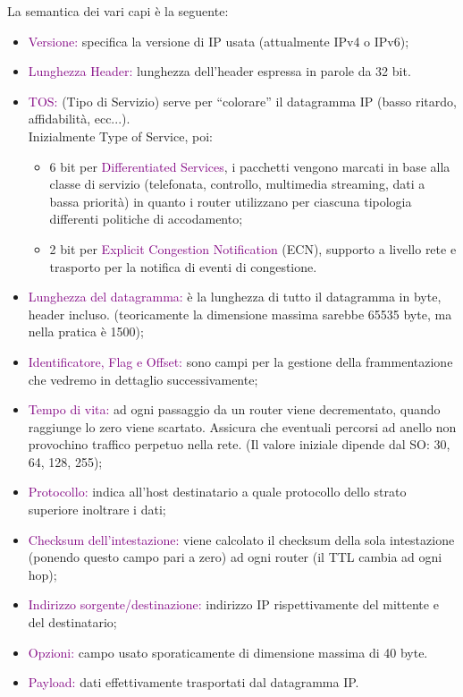 La semantica dei vari capi è la seguente:
\begin{itemize}
    \item \textcolor{purple}{Versione:} specifica la versione di IP usata (attualmente IPv4 o IPv6); 
    \item \textcolor{purple}{Lunghezza Header:} lunghezza dell'header espressa in parole da 32 bit.
    \item \textcolor{purple}{TOS:} (Tipo di Servizio) serve per “colorare” il datagramma IP (basso ritardo, affidabilità, ecc...). 
    \\Inizialmente Type of Service, poi:
        \begin{itemize}
            \item 6 bit per \textcolor{purple}{Differentiated Services}, i pacchetti vengono marcati in base alla classe di servizio (telefonata, controllo, multimedia streaming, dati a bassa priorità) in quanto i router utilizzano per ciascuna tipologia differenti politiche di accodamento;
            \item 2 bit per \textcolor{purple}{Explicit Congestion Notification} (ECN), supporto a livello rete e trasporto per la notifica di eventi di congestione.
        \end{itemize}
    \item \textcolor{purple}{Lunghezza del datagramma:} è la lunghezza di tutto il datagramma in byte, header incluso. (teoricamente la dimensione massima sarebbe 65535 byte, ma nella pratica è 1500);
    \item \textcolor{purple}{Identificatore, Flag e Offset:} sono campi per la gestione della frammentazione che vedremo in dettaglio successivamente;
    \item \textcolor{purple}{Tempo di vita:} ad ogni passaggio da un router viene decrementato, quando raggiunge lo zero viene scartato. Assicura che eventuali percorsi ad anello non provochino traffico perpetuo nella rete. (Il valore iniziale dipende dal SO: 30, 64, 128, 255);
    \item \textcolor{purple}{Protocollo:} indica all’host destinatario a quale protocollo dello strato superiore inoltrare i dati;
    \item \textcolor{purple}{Checksum dell'intestazione:} viene calcolato il checksum della sola intestazione (ponendo questo campo pari a zero) ad ogni router (il TTL cambia ad ogni hop);
    \item \textcolor{purple}{Indirizzo sorgente/destinazione:} indirizzo IP rispettivamente del mittente e del destinatario;
    \item \textcolor{purple}{Opzioni:} campo usato sporaticamente di dimensione massima di 40 byte.
    \item \textcolor{purple}{Payload:} dati effettivamente trasportati dal datagramma IP.
\end{itemize}

